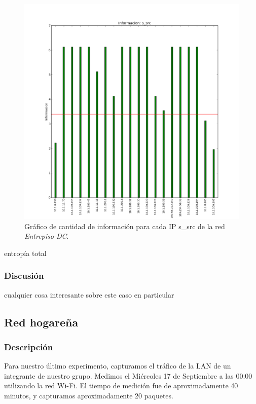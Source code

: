 \documentclass[10pt, a4paper]{article}
\begin{document}
\begin{figure}[H]
\begin{minipage}{0.48\linewidth}
    \includegraphics[width=\linewidth]{../imgs/entrepiso-dc-ips_s_src_info.png}
    \caption{Gráfico de cantidad de información para cada IP s\_src de la red \emph{Entrepiso-DC}.}
    \label{fig:informacion-entrepiso-dc-s-src}
  \end{minipage}
\end{figure}

entropía total

\subsubsection{Discusión}

cualquier cosa interesante sobre este caso en particular

\subsection{Red hogareña}

\subsubsection{Descripción}
Para nuestro último experimento, capturamos el tráfico de la LAN de un integrante de nuestro grupo. Medimos el Miércoles 17 de Septiembre a las 00:00 utilizando la red Wi-Fi. El tiempo de medición fue de aproximadamente 40 minutos, y capturamos aproximadamente 20 paquetes.
\end{document}
